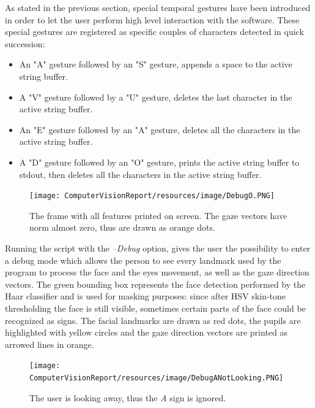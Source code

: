 \documentclass[a4paper, 12pt]{article}
\begin{document}
As stated in the previous section, special temporal gestures have been introduced in order to let the user perform high level interaction with the software. These special gestures are registered as specific couples of characters detected in quick succession:\linebreak
\begin{itemize}
\item An "A" gesture followed by an "S" gesture, appends a space to the active string buffer.
\item A "V" gesture followed by a "U" gesture, deletes the last character in the active string buffer.
\item An "E" gesture followed by an "A" gesture, deletes all the characters in the active string buffer.
\item A "D" gesture followed by an "O" gesture, prints the active string buffer to stdout, then deletes all the characters in the active string buffer.
\end{itemize}

\begin{figure}[!h]
    \centering
    \texttt{[image: ComputerVisionReport/resources/image/DebugO.PNG]} \caption{The frame with all features printed on screen. The gaze vectors have norm almost zero, thus are drawn as orange dots.}
\end{figure}

Running the script with the \textit{--Debug} option, gives the user the possibility to enter a debug mode which allows the person to see every landmark used by the program to process the face and the eyes movement, as well as the gaze direction vectors.\linebreak
The green bounding box represents the face detection performed by the Haar classifier and is used for masking purposes: since after HSV skin-tone thresholding the face is still visible, sometimes certain parts of the face could be recognized as signs.\linebreak
The facial landmarks are drawn as red dots, the pupils are highlighted with yellow circles and the gaze direction vectors are printed as arrowed lines in orange.

\begin{figure}[!h]
    \centering
    \texttt{[image: ComputerVisionReport/resources/image/DebugANotLooking.PNG]} \caption{The user is looking away, thus the \textit{A} sign is ignored.}
\end{figure}
\end{document}
